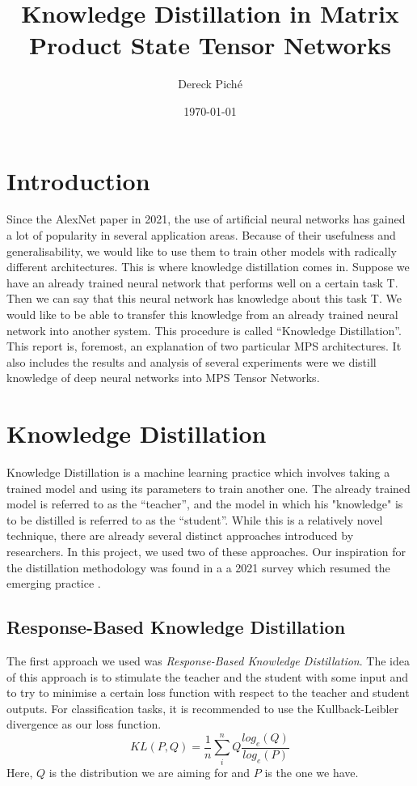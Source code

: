 \documentclass{article}
\title{Knowledge Distillation in Matrix Product State Tensor Networks}
\author{Dereck Piché}
\date{\today}
\theoremstyle{definition}
\theoremstyle{definition}
\begin{document}
\maketitle

\section{Introduction}
Since the AlexNet \cite{alexnet} paper in 2021, the use of artificial neural networks has gained a lot of popularity in several application areas. Because of their usefulness and generalisability, we would like to use them to train other models with radically different architectures. This is where knowledge distillation comes in. Suppose we have an already trained neural network that performs well on a certain task T. Then we can say that this neural network has knowledge about this task T. We would like to be able to transfer this knowledge from an already trained neural network into another system. This procedure is called \enquote{Knowledge Distillation}. This report is, foremost, an explanation of two particular MPS architectures. It also includes the results and analysis of several experiments were we distill knowledge of deep neural networks into MPS Tensor Networks.


\section{Knowledge Distillation}
Knowledge Distillation is a machine learning practice which involves
taking a trained model and using its parameters to train another one.
The already trained model is referred to as the \enquote{teacher}, and 
the model in which his "knowledge" is to be distilled is referred to as
the \enquote{student}. While this is a relatively novel technique, there are 
already several distinct approaches introduced by researchers.
In this project, we used two of these approaches. Our inspiration for the distillation 
methodology was found in a a 2021 survey which resumed the emerging 
practice \cite{Gou_2021}.

\subsection{Response-Based Knowledge Distillation}
The first approach we used was \emph{Response-Based Knowledge Distillation}. The idea of this approach is to stimulate the teacher and the student with some input and to try to minimise a certain loss function with respect to the teacher and student outputs. For classification tasks, it is recommended to use the Kullback-Leibler divergence as our loss function. 
\begin{equation}
    KL(P, Q) = \frac{1}{n} \sum_i^n Q \frac{log_e(Q)}{log_e(P)}
\end{equation}
Here, $Q$ is the distribution we are aiming for and $P$ is the one we have.
\end{document}
